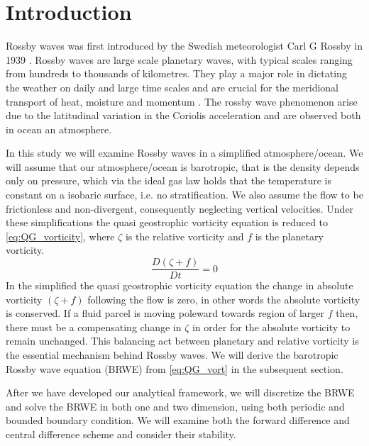 \section{Introduction}
Rossby waves was first introduced by the Swedish meteorologist
Carl G Rossby in 1939 \parencite{Rossby1939}. Rossby waves are large scale
planetary waves, with typical scales ranging from 
hundreds to thousands of kilometres. They play a major role in dictating
the weather on daily and large time scales and are crucial for the meridional
transport of heat, moisture and momentum \parencite{midSynDyn}. The rossby wave phenomenon arise due to the
latitudinal variation in the Coriolis acceleration and are observed both in
ocean an atmosphere. 

In this study we will examine Rossby waves in a simplified 
atmosphere/ocean. We will assume that our atmosphere/ocean is barotropic, that
is the density depends only on pressure, which via the ideal gas law holds that
the temperature is constant on a isobaric surface, i.e. no stratification. We also assume the flow to be frictionless and
non-divergent, consequently neglecting vertical velocities. Under these
simplifications the quasi geostrophic vorticity equation is reduced to
\cref{eq:QG_vorticity}, where $\zeta$ is the relative vorticity and $f$ is the
planetary vorticity. 
\begin{equation}\label{eq:QG_vorticity}
    \frac{D(\zeta + f)}{Dt} = 0
\end{equation}
In the simplified the quasi geostrophic vorticity equation the
change in absolute vorticity $(\zeta + f)$ following the flow is zero, in other
words the absolute vorticity is conserved. If a fluid parcel is moving
poleward towards region of larger $f$ then, there must be a compensating change
in $\zeta$ in order for the absolute vorticity to remain unchanged. This
balancing act between planetary and relative vorticity is the essential
mechanism behind
Rossby waves. We will derive the barotropic Rossby
wave equation (BRWE) from \cref{eq:QG_vort} in the subsequent section.

After we have developed our analytical framework, we will discretize the BRWE
and solve the BRWE in both one and two dimension, using both periodic and
bounded boundary condition. We will examine both the forward
difference and central difference scheme and consider their stability. 